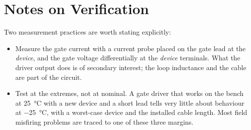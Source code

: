 \section*{Notes on Verification}

Two measurement practices are worth stating explicitly:

\begin{itemize}
  \item Measure the gate current with a current probe placed on the gate lead at
        the \emph{device}, and the gate voltage differentially at the \emph{device}
        terminals. What the driver output does is of secondary interest; the loop
        inductance and the cable are part of the circuit.
  \item Test at the extremes, not at nominal. A gate driver that works on the bench
        at \SI{25}{\celsius} with a new device and a short lead tells very little
        about behaviour at \SI{-25}{\celsius}, with a worst-case device and the
        installed cable length. Most field misfiring problems are traced to one of
        these three margins.
\end{itemize}


